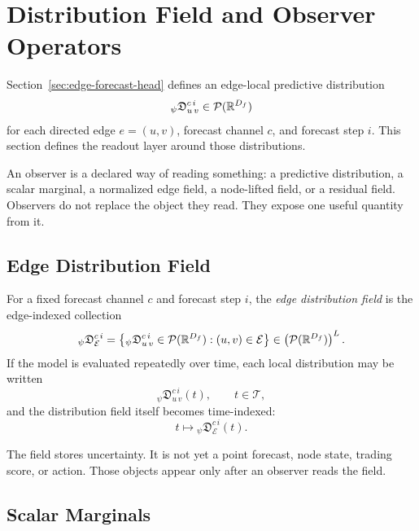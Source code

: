 \newpage{}
\section{Distribution Field and Observer Operators}
\label{sec:distribution-field-and-observer-operators}

Section~\ref{sec:edge-forecast-head} defines an edge-local predictive
distribution
\[
  {}_{\psi}\mathfrak{D}_{u\,v}^{c\,i}
  \in
  \mathcal{P}(\mathbb{R}^{D_f})
\]
for each directed edge $e=(u,v)$, forecast channel $c$, and forecast step $i$.
This section defines the readout layer around those distributions.

An observer is a declared way of reading something: a predictive distribution,
a scalar marginal, a normalized edge field, a node-lifted field, or a residual
field.  Observers do not replace the object they read.  They expose one useful
quantity from it.


\subsection{Edge Distribution Field}
\label{subsec:edge-distribution-field}

For a fixed forecast channel $c$ and forecast step $i$, the
\emph{edge distribution field} is the edge-indexed collection
\[
  {}_{\psi}\mathfrak{D}_{\mathcal{E}}^{c\,i}
  =
  \left\{
    {}_{\psi}\mathfrak{D}_{u\,v}^{c\,i}
    \in
    \mathcal{P}(\mathbb{R}^{D_f})
    :
    (u,v)\in\mathcal{E}
  \right\}
  \in
  \left(\mathcal{P}(\mathbb{R}^{D_f})\right)^L.
\]
If the model is evaluated repeatedly over time, each local distribution may be
written
\[
  {}_{\psi}\mathfrak{D}_{u\,v}^{c\,i}(t),
  \qquad
  t\in\mathcal{T},
\]
and the distribution field itself becomes time-indexed:
\[
  t
  \longmapsto
  {}_{\psi}\mathfrak{D}_{\mathcal{E}}^{c\,i}(t).
\]

The field stores uncertainty.  It is not yet a point forecast, node state,
trading score, or action.  Those objects appear only after an observer reads the
field.

\subsection{Scalar Marginals}
\label{subsec:scalar-marginals}

